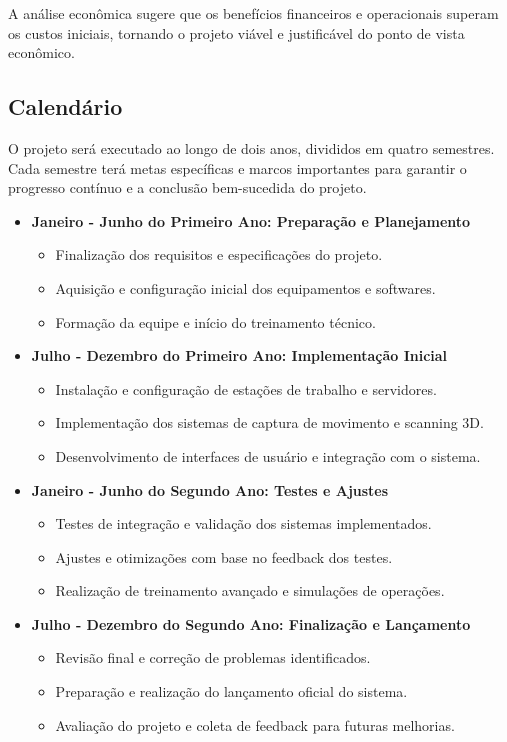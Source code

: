 A análise econômica sugere que os benefícios financeiros e operacionais superam os custos iniciais, tornando o projeto viável e justificável do ponto de vista econômico.
\subsection{Calendário}
O projeto será executado ao longo de dois anos, divididos em quatro semestres. Cada semestre terá metas específicas e marcos importantes para garantir o progresso contínuo e a conclusão bem-sucedida do projeto.

\begin{itemize}
    \item \textbf{Janeiro - Junho do Primeiro Ano: Preparação e Planejamento}
    \begin{itemize}
        \item Finalização dos requisitos e especificações do projeto.
        \item Aquisição e configuração inicial dos equipamentos e softwares.
        \item Formação da equipe e início do treinamento técnico.
    \end{itemize}
    \item \textbf{Julho - Dezembro do Primeiro Ano: Implementação Inicial}
    \begin{itemize}
        \item Instalação e configuração de estações de trabalho e servidores.
        \item Implementação dos sistemas de captura de movimento e scanning 3D.
        \item Desenvolvimento de interfaces de usuário e integração com o sistema.
    \end{itemize}
    \item \textbf{Janeiro - Junho do Segundo Ano: Testes e Ajustes}
    \begin{itemize}
        \item Testes de integração e validação dos sistemas implementados.
        \item Ajustes e otimizações com base no feedback dos testes.
        \item Realização de treinamento avançado e simulações de operações.
    \end{itemize}
    \item \textbf{Julho - Dezembro do Segundo Ano: Finalização e Lançamento}
    \begin{itemize}
        \item Revisão final e correção de problemas identificados.
        \item Preparação e realização do lançamento oficial do sistema.
        \item Avaliação do projeto e coleta de feedback para futuras melhorias.
    \end{itemize}
\end{itemize}

